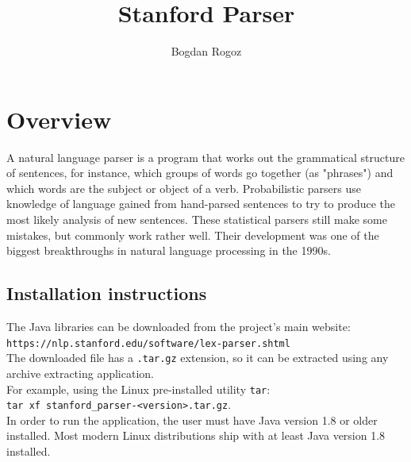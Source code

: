 \documentclass[a4paper,10pt]{article}
\title{Stanford Parser}
\author{Bogdan Rogoz}
\begin{document}
\maketitle



\tableofcontents
\section{Overview}
A natural language parser is a program that works out the grammatical structure of sentences, for instance, which groups of words go together (as "phrases") and which words are the subject or object of a verb. Probabilistic parsers use knowledge of language gained from hand-parsed sentences to try to produce the most likely analysis of new sentences. These statistical parsers still make some mistakes, but commonly work rather well. Their development was one of the biggest breakthroughs in natural language processing in the 1990s.

 \subsection{Installation instructions}
The Java libraries can be downloaded from the project's main website: \\
\verb|https://nlp.stanford.edu/software/lex-parser.shtml| \\
The downloaded file has a \verb|.tar.gz| extension, so it can be extracted using any archive extracting application. \\
For example, using the Linux pre-installed utility \verb|tar|: \\
\verb|tar xf stanford_parser-<version>.tar.gz|.\\
In order to run the application, the user must have Java version 1.8 or older installed. Most modern Linux distributions ship with at least Java
version 1.8 installed.
 
\end{document}

